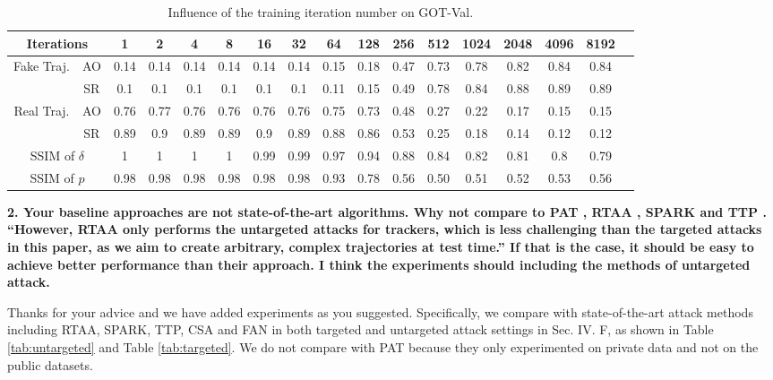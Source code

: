 \documentclass[12pt]{article}
\begin{document}
\begin{table}[h]
    \centering
    \renewcommand\tabcolsep{5.5pt} %
    \caption{Influence of the training iteration number on GOT-Val.}
    \begin{tabular}{cc|ccccccccccccccc} 
    \toprule
    \multicolumn{2}{c|}{Iterations}     & 1     & 2     & 4     & 8     & 16    & 32    & 64    & 128   & 256   & 512   & 1024  & 2048  & 4096  & 8192  \\ 
    \midrule
    \multirow{2}{*}{Fake Traj.} & AO    &  0.14 & 0.14 & 0.14 & 0.14 & 0.14 & 0.14 & 0.15 & 0.18 & 0.47 & 0.73 & 0.78 & 0.82 & 0.84 & 0.84  \\
                                & SR    &  0.1 & 0.1 & 0.1 & 0.1 & 0.1 & 0.1 & 0.11 & 0.15 & 0.49 & 0.78 & 0.84 & 0.88 & 0.89 & 0.89    \\ 
    \midrule
    \multirow{2}{*}{Real Traj.} & AO   & 0.76 & 0.77 & 0.76 & 0.76 & 0.76 & 0.76 & 0.75 & 0.73 & 0.48 & 0.27 & 0.22 & 0.17 & 0.15 & 0.15    \\
                                & SR   & 0.89 & 0.9 & 0.89 & 0.89 & 0.9 & 0.89 & 0.88 & 0.86 & 0.53 & 0.25 & 0.18 & 0.14 & 0.12 & 0.12    \\ 
    \midrule
    \multicolumn{2}{c|}{SSIM of $\delta$}&   1 & 1 & 1 & 1 & 0.99 & 0.99 & 0.97 & 0.94 & 0.88 & 0.84 & 0.82 & 0.81 & 0.8 & 0.79\\
    \midrule
    \multicolumn{2}{c|}{SSIM of $p$}      &  0.98 & 0.98 & 0.98 & 0.98 & 0.98 & 0.98 & 0.93 & 0.78 & 0.56 & 0.50 & 0.51 & 0.52 & 0.53 & 0.56\\
    \bottomrule
    \end{tabular}
    \label{tab:iter}
\end{table}

\noindent \textbf{2. Your baseline approaches are not state-of-the-art algorithms. Why not compare to PAT \cite{PAT}, RTAA \cite{RTAA}, SPARK \cite{SPARK} and TTP \cite{TTP}. “However, RTAA only performs the untargeted attacks for trackers, which is less challenging than the targeted attacks in this paper, as we aim to create arbitrary, complex trajectories at test time.” If that is the case, it should be easy to achieve better performance than their approach. I think the experiments should including the methods of untargeted attack.}

Thanks for your advice and we have added experiments as you suggested. Specifically, we compare with state-of-the-art attack methods including RTAA, SPARK, TTP, CSA and FAN in both targeted and untargeted attack settings in Sec. IV. F, as shown in Table \ref{tab:untargeted} and Table \ref{tab:targeted}. 
We do not compare with PAT because they only experimented on private data and not on the public datasets.
\end{document}
